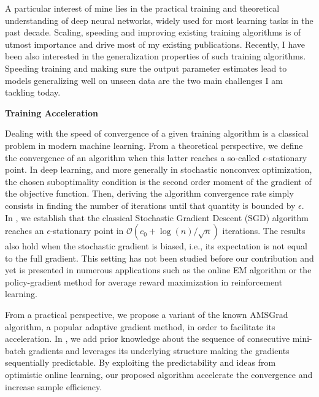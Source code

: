 \documentclass[twoside,11pt]{article}
\begin{document}
\vspace{0.2in}
\textbf{}
\vspace{0.2in}

A particular interest of mine lies in the practical training and theoretical understanding of deep neural networks, widely used for most learning tasks in the past decade.
Scaling, speeding and improving existing training algorithms is of utmost importance and drive most of my existing publications.
Recently, I have been also interested in the generalization properties of such training algorithms. 
Speeding training and making sure the output parameter estimates lead to models generalizing well on unseen data are the two main challenges I am tackling today.

\vspace{0.15in}
\textbf{Training Acceleration} 
\vspace{0.08in}

Dealing with the speed of convergence of a given training algorithm is a classical problem in modern machine learning.
From a theoretical perspective, we define the convergence of an algorithm when this latter reaches a so-called $\epsilon$-stationary point.
In deep learning, and more generally in stochastic nonconvex optimization, the chosen suboptimality condition is the second order moment of the gradient of the objective function. 
Then, deriving the algorithm convergence rate simply consists in finding the number of iterations until that quantity is bounded by $\epsilon$.
In \citep{karimi2019misso}, we  establish that the classical Stochastic Gradient Descent (SGD) algorithm reaches an $\epsilon$-stationary point in $\mathcal{O}\left(c_{0}+\log (n) / \sqrt{n}\right)$ iterations. 
The results also hold when the stochastic gradient is biased, i.e., its expectation is not equal to the full gradient. This setting has not been studied before our contribution and yet is presented in numerous applications such as the online EM algorithm or the policy-gradient method for average reward maximization in reinforcement learning.

From a practical perspective, we propose a variant of the known AMSGrad algorithm, a popular adaptive gradient method, in order to facilitate its acceleration.
In \citep{kun2020}, we add prior knowledge about the sequence of consecutive mini-batch gradients and leverages its underlying structure making the gradients sequentially predictable. 
By exploiting the predictability and ideas from optimistic online learning, our proposed algorithm accelerate the convergence and increase sample efficiency.
\end{document}
